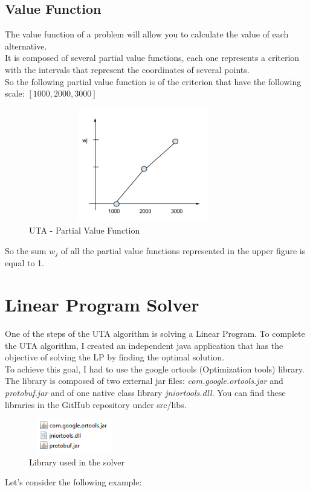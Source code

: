 \documentclass{report}
\begin{document}
\subsection{Value Function}
The value function of a problem will allow you to calculate the value of each alternative.\\
It is composed of several partial value functions, each one represents a criterion with the intervals that represent the coordinates of several points.\\
So the following partial value function is of the criterion that have the following scale: $[1000,2000,3000]$
\begin{figure}[H]
\centering
\includegraphics[width=10cm,height=5cm,keepaspectratio]{pvf.png}
\caption{UTA - Partial Value Function}
\end{figure}
So the sum $w_j$ of all the partial value functions represented in the upper figure is equal to 1.\\

\section{Linear Program Solver}
One of the steps of the UTA algorithm is solving a Linear Program. To complete the UTA algorithm, I created an independent java application that has the objective of solving the LP by finding the optimal solution.\\
To achieve this goal, I had to use the google ortools (Optimization tools) library. The library is composed of two external jar files: \textit{com.google.ortools.jar} and \textit{protobuf.jar} and of one native class library \textit{jniortools.dll}. You can find these libraries in the GitHub repository under src/libs.
\begin{figure}[H]
\centering
\includegraphics[width=4cm,height=1.5cm,keepaspectratio]{lp-libs.png}
\caption{Library used in the solver}
\end{figure}
Let's consider the following example:\\
\end{document}
